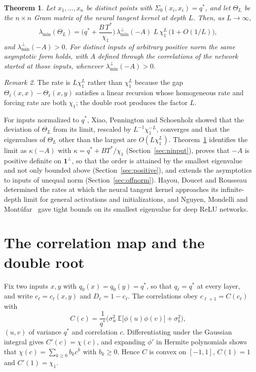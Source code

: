 \documentclass[11pt]{amsart}
\newtheorem{theorem}{Theorem}[section]
\theoremstyle{remark}\newtheorem{remark}[theorem]{Remark}
\newcommand{\E}{\mathbb{E}}
\begin{document}
\begin{theorem}\label{thm:main}
Let $x_1,\dots,x_n$ be distinct points with $\Sigma_0(x_i,x_i)=q^*$, and let $\Theta_L$ be the $n\times n$ Gram matrix
of the neural tangent kernel at depth $L$. Then, as $L\to\infty$,
\[
\lambda_{\min}(\Theta_L)=\Big(q^*+\frac{B\,T^*}{\chi_1}\Big)\,\lambda_{\min}^\perp(-A)\;L\,\chi_1^{L}\,\big(1+O(1/L)\big),
\]
and $\lambda_{\min}^\perp(-A)>0$. For distinct inputs of arbitrary positive norm the same asymptotic form holds, with
$A$ defined through the correlations of the network started at those inputs, whenever $\lambda_{\min}^\perp(-A)>0$.
\end{theorem}

\begin{remark}
The rate is $L\chi_1^L$ rather than $\chi_1^L$ because the gap $\Theta_\ell(x,x)-\Theta_\ell(x,y)$ satisfies a linear
recursion whose homogeneous rate and forcing rate are both $\chi_1$; the double root produces the factor $L$.
\end{remark}

For inputs normalized to $q^*$, Xiao, Pennington and Schoenholz \cite{xps} showed that the deviation of $\Theta_L$ from its limit,
rescaled by $L^{-1}\chi_1^{-L}$, converges and that the eigenvalues of $\Theta_L$ other than the largest are
$O(L\chi_1^L)$. Theorem~\ref{thm:main} identifies the limit as $\kappa(-A)$ with $\kappa=q^*+BT^*/\chi_1$
(Section~\ref{sec:ninput}), proves that $-A$ is positive definite on $\mathbf 1^\perp$, so that the order is attained by
the smallest eigenvalue and not only bounded above (Section~\ref{sec:positive}), and extends the asymptotics to inputs of
unequal norm (Section~\ref{sec:offnorm}). Hayou, Doucet and Rousseau~\cite{hdr} determined the rates at which the
neural tangent kernel approaches its infinite-depth limit for general activations and initializations, and Nguyen,
Mondelli and Mont\'ufar~\cite{nmm} gave tight bounds on its smallest eigenvalue for deep ReLU networks.

\section{The correlation map and the double root}\label{sec:double}
Fix two inputs $x,y$ with $q_0(x)=q_0(y)=q^*$, so that $q_\ell=q^*$ at every layer, and write $c_\ell=c_\ell(x,y)$ and
$D_\ell=1-c_\ell$. The correlations obey $c_{\ell+1}=C(c_\ell)$ with
\[
C(c)=\frac{1}{q^*}\Big(\sigma_w^2\,\E\big[\phi(u)\phi(v)\big]+\sigma_b^2\Big),
\]
$(u,v)$ of variance $q^*$ and correlation $c$. Differentiating under the Gaussian integral gives $C'(c)=\chi(c)$, and
expanding $\phi'$ in Hermite polynomials shows that $\chi(c)=\sum_{k\ge0}b_kc^k$ with $b_k\ge0$. Hence $C$ is convex on
$[-1,1]$, $C(1)=1$ and $C'(1)=\chi_1$.
\end{document}

